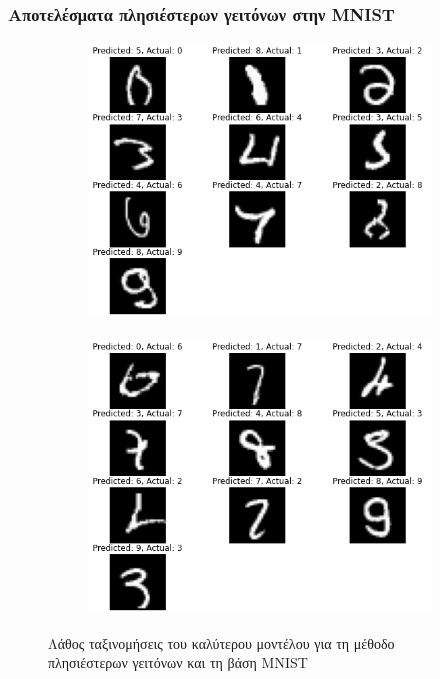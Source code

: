 \documentclass{beamer}
\begin{document}
\begin{frame}
\frametitle{Αποτελέσματα πλησιέστερων γειτόνων στην MNIST}

\begin{figure}[H]
    \centering

    \begin{subfigure}[t]{0.48\linewidth}
    \includegraphics[width=\linewidth]{mnist/wrong_results_knn_1.png}
    \end{subfigure}
    \begin{subfigure}[t]{0.48\linewidth}
    \includegraphics[width=\linewidth]{mnist/wrong_results_knn_2.png}
    \end{subfigure}

    \caption{Λάθος ταξινομήσεις του καλύτερου μοντέλου για τη μέθοδο
    πλησιέστερων γειτόνων και τη βάση MNIST}
    \label{fig:mnist_wrong_knn}
\end{figure}

\end{frame}
\end{document}
